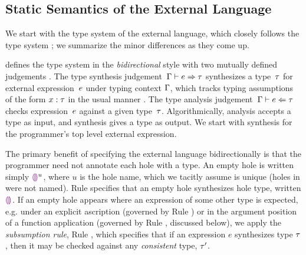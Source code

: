 
\subsection{Static Semantics of the External Language}
\label{sec:external-statics}






We start with the type system of the \HazelnutLive external language,
which closely follows the \Hazelnut type system \cite{popl-paper}; we summarize the minor differences as they come up.


 defines the type system in the \emph{bidirectional} style
%
with two mutually defined judgements \cite{Pierce:2000ve,bidi-tutorial,DBLP:conf/icfp/DunfieldK13,Chlipala:2005da}. The type synthesis
judgement~$\Gamma \vdash e \Rightarrow \tau$ synthesizes a type~$\tau$
for external expression~$e$ under typing context $\Gamma$, which tracks typing
assumptions of the form $x : \tau$ in the usual
manner \cite{pfpl,tapl}.
%
The type analysis judgement~$\Gamma \vdash e \Leftarrow \tau$ checks
expression~$e$ against a given type~$\tau$.
%
Algorithmically, analysis accepts a type as input, and synthesis gives
a type as output.
%
We start with synthesis for the programmer's top level external
expression.


The primary benefit of specifying the \HazelnutLive external language
bidirectionally is that the programmer need not annotate each hole with a type.
%
An empty hole is
written simply $\textcolor{violet}{\llparenthesis}\textcolor{violet}{\rrparenthesis}^{u}$, where $u$ is the hole name, which we tacitly assume is unique
(holes in \Hazelnut were not named).
Rule  specifies that an empty hole synthesizes hole type, written $\textcolor{violet}{\llparenthesis}\textcolor{violet}{\rrparenthesis}$.
%
If an empty hole appears where an expression of some other type is
expected, e.g. under an explicit ascription (governed by Rule )
or in the argument position of a function application (governed by
Rule , discussed below), we apply the \emph{subsumption rule},
Rule , which specifies that if an expression $e$ synthesizes
type $\tau$, then it may be checked against any \emph{consistent}
type, $\tau'$.

